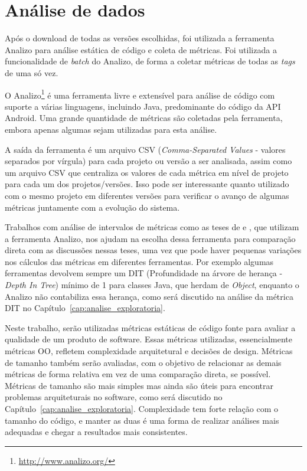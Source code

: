 \section{Análise de dados}

Após o download de todas as versões escolhidas, foi utilizada a ferramenta Analizo para análise estática de código e coleta de métricas. Foi utilizada a funcionalidade de \textit{batch} do Analizo, de forma a coletar métricas de todas as \textit{tags} de uma só vez. 

O Analizo\footnote{\url{http://www.analizo.org/}} é uma ferramenta livre e extensível para análise de código com suporte a várias linguagens, incluindo Java, predominante do código da API Android. Uma grande quantidade de métricas são coletadas pela ferramenta, embora apenas algumas sejam utilizadas para esta análise.

A saída da ferramenta é um arquivo CSV (\textit{Comma-Separated Values} - valores separados por vírgula) para cada projeto ou versão a ser analisada, assim como um arquivo CSV que centraliza os valores de cada métrica em nível de projeto para cada um dos projetos/versões. Isso pode ser interessante quanto utilizado com o mesmo projeto em diferentes versões para verificar o avanço de algumas métricas juntamente com a evolução do sistema.

Trabalhos com análise de intervalos de métricas como as teses de  e , que utilizam a ferramenta Analizo, nos ajudam na escolha dessa ferramenta para comparação direta com as discussões nessas teses, uma vez que pode haver pequenas variações nos cálculos das métricas em diferentes ferramentas. Por exemplo algumas ferramentas devolvem sempre um DIT (Profundidade na árvore de herança - \textit{Depth In Tree}) mínimo de 1 para classes Java, que herdam de \textit{Object}, enquanto o Analizo não contabiliza essa herança, como será discutido na análise da métrica DIT no Capítulo~\ref{cap:analise_exploratoria}.

Neste trabalho, serão utilizadas métricas estáticas de código fonte para avaliar a qualidade de um produto de software. Essas métricas utilizadas, essencialmente métricas OO, refletem complexidade arquitetural e decisões de design. Métricas de tamanho também serão avaliadas, com o objetivo de relacionar as demais métricas de forma relativa em vez de uma comparação direta, se possível. Métricas de tamanho são mais simples mas ainda são úteis para encontrar problemas arquiteturais no software, como será discutido no Capítulo~\ref{cap:analise_exploratoria}. Complexidade tem forte relação com o tamanho do código, e manter as duas é uma forma de realizar análises mais adequadas e chegar a resultados mais consistentes.

